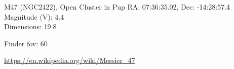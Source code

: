 \begin{block}{M47 (NGC2422), Open Cluster in Pup}
    RA: 07:36:35.02, Dec: -14:28:57.4 \\ 
    Magnitude (V): 4.4 \\ 
    Dimensions: 19.8 

    Finder fov: 60 

    \url{https://en.wikipedia.org/wiki/Messier_47} 
\end{block}